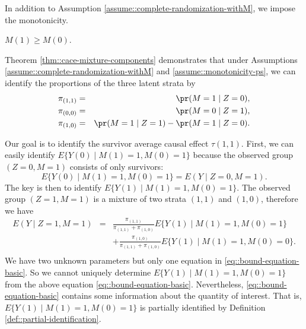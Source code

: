 In addition to Assumption \ref{assume::complete-randomization-withM}, we impose the monotonicity.

\begin{assumption}
[monotonicity]\label{assume::monotonicity-ps}
$M(1) \geq M(0)$.
\end{assumption}


Theorem \ref{thm::cace-mixture-components} demonstrates that under Assumptions \ref{assume::complete-randomization-withM} and \ref{assume::monotonicity-ps}, we can identify the proportions of the three latent strata by
\begin{eqnarray*} 
 \pi_{(1,1)} &=& \pr(M=1\mid Z=0), \\
 \pi_{(0,0)} &=& \pr(M=0\mid Z=1), \\
 \pi_{(1,0)} &=& \pr(M=1\mid Z=1) - \pr(M=1\mid Z=0). 
\end{eqnarray*} 


Our goal is to identify the survivor average causal effect $\tau(1,1)$. First, we can easily identify $E\{ Y(0)\mid M(1) = 1, M(0)=1 \}$ because the observed group $(Z=0,M=1)$ consists of only survivors:
$$
E\{ Y(0)\mid M(1) = 1, M(0)=1 \} = E(Y\mid Z=0, M=1). 
$$
The key is then to identify $E\{ Y(1)\mid M(1) = 1, M(0)=1 \}$. The observed group $(Z=1,M=1)$ is a mixture of two strata $(1,1)$ and $(1,0)$, therefore we have 
\begin{eqnarray} 
E(Y\mid Z=1,M=1) 
&=& \frac{ \pi_{(1,1)}}{ \pi_{(1,1)} + \pi_{(1,0)}} E\{  Y(1)\mid   M(1)=1, M(0)=1 \} \nonumber  \\
&&+ \frac{ \pi_{(1,0)}}{ \pi_{(1,1)} + \pi_{(1,0)}} E\{  Y(1)\mid  M(1)=1, M(0)=0 \}. \nonumber  \\
&& \label{eq::bound-equation-basic}
\end{eqnarray} 
We have two unknown parameters but only one equation in \eqref{eq::bound-equation-basic}. So we cannot uniquely determine $E\{  Y(1)\mid   M(1)=1, M(0)=1 \}$ from the above equation \eqref{eq::bound-equation-basic}. Nevertheless, \eqref{eq::bound-equation-basic} contains some information about the quantity of interest. 
That is, $E\{  Y(1)\mid   M(1)=1, M(0)=1 \}$  is partially identified by Definition \ref{def::partial-identification}. 



